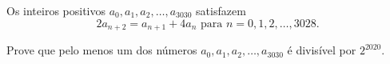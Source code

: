 Os inteiros positivos $a_0, a_1, a_2, \ldots, a_{3030}$ satisfazem $$2a_{n + 2} = a_{n + 1} + 4a_n \text{ para } n = 0, 1, 2, \ldots, 3028.$$

Prove que pelo menos um dos números $a_0, a_1, a_2, \ldots, a_{3030}$ é divisível por $2^{2020}$.
